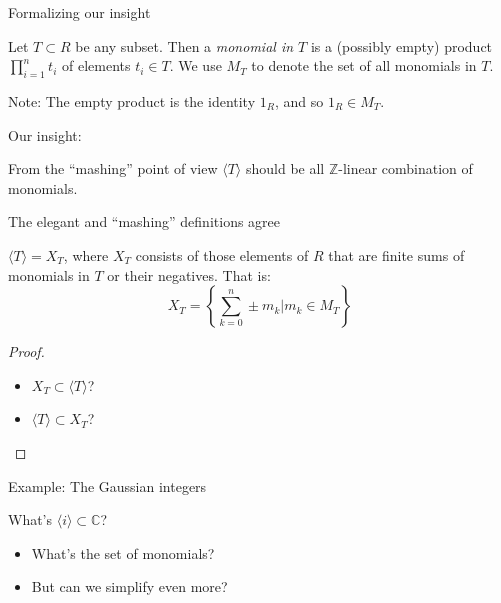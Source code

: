 \documentclass{beamer}
\newcommand{\C}{\mathbb{C}}
\begin{document}
\begin{frame}{Formalizing our insight}

\begin{definition} Let $T\subset R$ be any subset.  Then a \emph{monomial in $T$} is a (possibly empty) product $\prod_{i=1}^n t_i$ of elements $t_i\in T$.  We use $M_T$ to denote the set of all monomials in $T$.
\end{definition}

\begin{block}{Note:}
The empty product is the identity $1_R$, and so $1_R\in M_T$.
\end{block}

\begin{block}{Our insight:}

From the ``mashing'' point of view $\langle T\rangle$ should be all $\mathbb{Z}$-linear combination of monomials.  

\end{block}

\end{frame}


\begin{frame}{The elegant and ``mashing'' definitions agree}

\begin{lemma} $\langle T\rangle=X_T$, where $X_T$ consists of those elements of $R$ that are finite sums of monomials in $T$ or their negatives.  That is: 
$$X_T=\left\{\sum_{k=0}^n \pm m_k \Big| m_k\in M_T\right\}$$

\end{lemma}

\begin{proof} 
\begin{itemize}
\item $X_T\subset \langle T\rangle$? 
\item $\langle T\rangle \subset X_T$?
\end{itemize}
\end{proof}

\end{frame}

\begin{frame}{Example: The Gaussian integers}

\begin{block}{What's $\langle i\rangle\subset\C$?}
  \begin{itemize}
  \item What's the set of monomials?
  \item But can we simplify even more?
  \end{itemize}
  
  
\end{block}




\end{frame}
\end{document}
